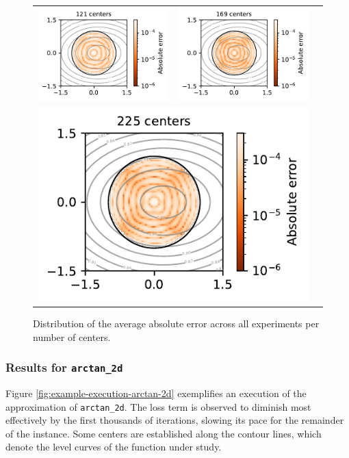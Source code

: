 \documentclass[12pt]{report} %
\begin{document}
\begin{figure}
\begin{tabular}{ccl}
    \multicolumn{1}{r}{\includegraphics[width=.4\textwidth, clip=true,trim={0 0 2.1cm 0}]{imagenes/experiments/2d/statistical_2d_full_scheduler_interpolation/runge_2d/runge_2d_121.pdf}} & \includegraphics[width=.4\textwidth, clip=true,trim={0 0 2.1cm 0}]{imagenes/experiments/2d/statistical_2d_full_scheduler_interpolation/runge_2d/runge_2d_169.pdf} & \\
    \multicolumn{2}{l}{\includegraphics[width=.4\textwidth, clip=true,trim={0 0 2.1cm 0}]{imagenes/experiments/2d/statistical_2d_full_scheduler_interpolation/runge_2d/runge_2d_225.pdf}} &
  \end{tabular}
  \caption{Distribution of the average absolute error across all experiments per number of centers.}
  \label{fig:runge-2d-results-errors-avg}
\end{figure}

\clearpage
\subsubsection*{Results for \texttt{arctan\_2d}}


Figure \ref{fig:example-execution-arctan-2d} exemplifies an execution of the approximation of \texttt{arctan\_2d}. The loss term is observed to diminish most effectively by the first thousands of iterations, slowing its pace for the remainder of the instance. Some centers are established along the contour lines, which denote the level curves of the function under study.
\end{document}
